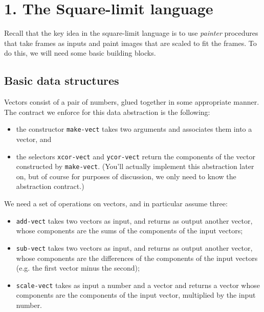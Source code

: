 \section{1. The Square-limit language}

Recall that the key idea in the square-limit language
is to use {\em painter} procedures that take frames as inputs and
paint images that are scaled to fit the frames.  To do this, we will
need some basic building blocks.

\subsection{Basic data structures}

Vectors consist of a pair of numbers, glued together in some
appropriate manner.  The contract we enforce for this data abstraction
is the following:

\begin{itemize}

\item  the constructor {\tt make-vect} takes two arguments and
associates them into a vector, and

\item  the selectors {\tt xcor-vect} and
{\tt ycor-vect} return the components of the vector constructed by
{\tt make-vect}. (You'll actually  implement this abstraction later
on, but of course for purposes of discussion, we only need to know the
abstraction contract.)


\end{itemize}

We need a set of operations on vectors, and in particular assume
three:

\begin{itemize}

\item 
{\tt add-vect} takes two vectors as input, and returns as output
another vector, whose components are the sums of the components of the
input vectors;

\item {\tt sub-vect} takes two vectors as input, and returns as output
another vector, whose components are the differences of the components of the
input vectors (e.g. the first vector minus the second);

\item {\tt scale-vect} takes as input a number and a vector and returns a
vector whose components are the components of the input vector,
multiplied by the input number.

\end{itemize}

